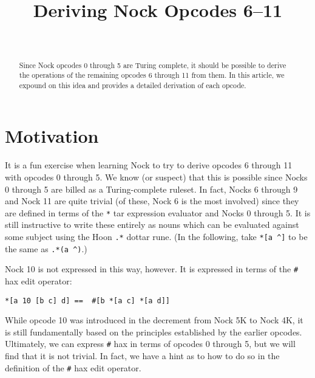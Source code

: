 \documentclass[twoside]{article}
\title{Deriving Nock Opcodes 6–11}
\author{\authorname~\authorpatp \\ \affiliation}
\date{}
\begin{document}
\maketitle
\thispagestyle{firststyle}

\begin{abstract}
  Since Nock opcodes 0 through 5 are Turing complete, it should be possible to derive the operations of the remaining opcodes 6 through 11 from them.  In this article, we expound on this idea and provides a detailed derivation of each opcode.
\end{abstract}

\setcounter{page}{47}

\tableofcontents

\section{Motivation}

It is a fun exercise when learning Nock to try to derive opcodes 6 through 11 with opcodes 0 through 5. We know (or suspect) that this is possible since Nocks 0 through 5 are billed as a Turing-complete ruleset. In fact, Nocks 6 through 9 and Nock 11 are quite trivial (of these, Nock 6 is the most involved) since they are defined in terms of the \lstinline[style=inlinecode]{*} tar expression evaluator and Nocks 0 through 5. It is still instructive to write these entirely as nouns which can be evaluated against some subject using the Hoon \lstinline[style=inlinecode]{.*} dottar rune. (In the following, take \lstinline[style=inlinecode]{*[a ^]} to be the same as \lstinline[style=inlinecode]{.*(a ^)}.)

Nock 10 is not expressed in this way, however. It is expressed in terms of the \lstinline[style=inlinecode]{#} hax edit operator:

\begin{lstlisting}[style=listingcode]
*[a 10 [b c] d] ==  #[b *[a c] *[a d]]
\end{lstlisting}

\noindent
While opcode 10 was introduced in the decrement from Nock 5K to Nock 4K, it is still fundamentally based on the principles established by the earlier opcodes.  Ultimately, we can express \lstinline[style=inlinecode]{#} hax in terms of opcodes 0 through 5, but we will find that it is not trivial. In fact, we have a hint as to how to do so in the definition of the \lstinline[style=inlinecode]{#} hax edit operator.
\end{document}
